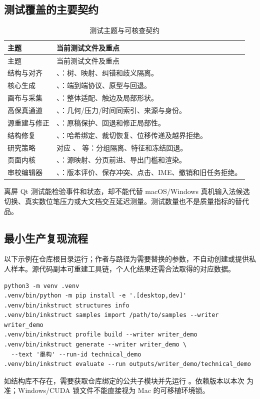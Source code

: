 \documentclass[UTF8,a4paper,11pt,fontset=fandol]{ctexart}
\newcommand{\code}[1]{\texttt{\detokenize{#1}}}
\begin{document}
\subsection{测试覆盖的主要契约}
\begin{longtable}{L{34mm}L{110mm}}
\caption{测试主题与可核查契约}\\\toprule
主题 & 当前测试文件及重点\\\midrule\endfirsthead
\toprule 主题 & 当前测试文件及重点\\\midrule\endhead
结构与对齐 & 、：树、映射、纠错和歧义隔离。\\
核心生成 & 、：端到端协议、原型与回退。\\
画布与采集 & 、：整体适配、触边及局部形状。\\
高保真通道 & 、：几何/压力/时间同索引、来源与身份。\\
源重建与修正 & 、：原稿保护、回退和修正局部性。\\
结构修复 & 、：哈希绑定、裁切恢复、位移传递及越界拒绝。\\
研究策略 & 对应 、 等：分组隔离、特征和冻结回退。\\
页面内核 & 、：源映射、分页前进、导出门槛和渲染。\\
审校编辑器 & 、：版本评价、保存冲突、点击、IME、撤销和旧任务拒绝。\\
\bottomrule
\end{longtable}
离屏 Qt 测试能检验事件和状态，却不能代替 macOS/Windows 真机输入法候选切换、真实数位笔压力或大文档交互延迟测量。测试数量也不是质量指标的替代品。

\subsection{最小生产复现流程}
以下示例在仓库根目录运行；作者与路径为需要替换的参数，不自动创建或提供私人样本。源代码副本可重建工具链，个人化结果还需合法取得的对应数据。
\begin{lstlisting}
python3 -m venv .venv
.venv/bin/python -m pip install -e '.[desktop,dev]'
.venv/bin/inkstruct structures info
.venv/bin/inkstruct samples import /path/to/samples --writer writer_demo
.venv/bin/inkstruct profile build --writer writer_demo
.venv/bin/inkstruct generate --writer writer_demo \
  --text '墨构' --run-id technical_demo
.venv/bin/inkstruct evaluate --run outputs/writer_demo/technical_demo
\end{lstlisting}
如结构库不存在，需要获取仓库绑定的公共子模块并先运行 \code{structures build}。依赖版本以本次  为准；Windows/CUDA 锁文件不能直接视为 Mac 的可移植环境锁。
\end{document}
